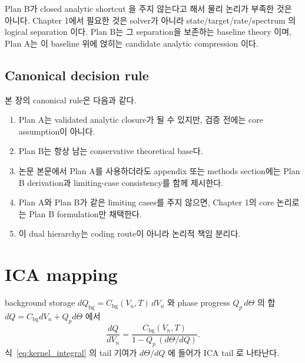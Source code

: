 \documentclass[11pt,a4paper]{article}
\newcommand{\bg}{\mathrm{bg}}
\begin{document}
Plan B가 closed analytic shortcut 을 주지 않는다고 해서 물리 논리가 부족한 것은 아니다. Chapter 1에서
필요한 것은 solver가 아니라 state/target/rate/spectrum 의 logical separation 이다. Plan B는 그
separation을 보존하는 baseline theory 이며, Plan A는 이 baseline 위에 얹히는 candidate analytic
compression 이다.

\subsection{Canonical decision rule}\label{sec:closure_decision}
본 장의 canonical rule은 다음과 같다.
\begin{enumerate}[label=\textbf{R\arabic*.}]
\item Plan A는 validated analytic closure가 될 수 있지만, 검증 전에는 core assumption이 아니다.
\item Plan B는 항상 남는 conservative theoretical base다.
\item 논문 본문에서 Plan A를 사용하더라도 appendix 또는 methods section에는 Plan B derivation과
  limiting-case consistency를 함께 제시한다.
\item Plan A와 Plan B가 같은 limiting cases를 주지 않으면, Chapter 1의 core 논리로는 Plan B
  formulation만 채택한다.
\item 이 dual hierarchy는 coding route이 아니라 논리적 책임 분리다.
\end{enumerate}
\section{ICA mapping}\label{sec:ica}
background storage $dQ_\bg=C_\bg(V_n,T)\,dV_n$ 와 phase progress $Q_p\,d\Theta$ 의 합
$dQ=C_\bg dV_n+Q_p d\Theta$ 에서
\begin{equation}
\boxed{\;\frac{dQ}{dV_n}=\frac{C_\bg(V_n,T)}{1-Q_p\,(d\Theta/dQ)}.\;}
\label{eq:ica}
\end{equation}
식~\eqref{eq:kernel_integral} 의 tail 기여가 $d\Theta/dQ$ 에 들어가 ICA tail 로 나타난다.
\end{document}
